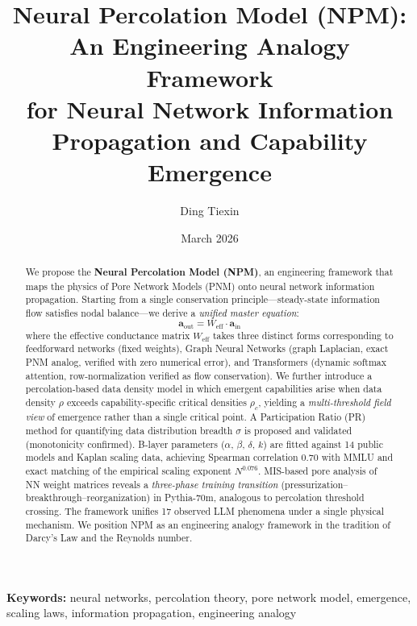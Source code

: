 \documentclass[11pt,a4paper]{article}
\newcommand{\Weff}{W_{\text{eff}}}
\begin{document}
\title{\textbf{Neural Percolation Model (NPM): An Engineering Analogy Framework\\
for Neural Network Information Propagation and Capability Emergence}}

\author[1]{Ding Tiexin}
\date{March 2026}

\maketitle

\begin{abstract}
We propose the \textbf{Neural Percolation Model (NPM)}, an engineering framework
that maps the physics of Pore Network Models (PNM) onto neural network information
propagation. Starting from a single conservation principle---steady-state information
flow satisfies nodal balance---we derive a \emph{unified master equation}:
\[
  \mathbf{a}_{\text{out}} = \Weff \cdot \mathbf{a}_{\text{in}}
\]
where the effective conductance matrix $\Weff$ takes three distinct forms
corresponding to feedforward networks (fixed weights), Graph Neural Networks
(graph Laplacian, exact PNM analog, verified with zero numerical error), and
Transformers (dynamic softmax attention, row-normalization verified as flow
conservation). We further introduce a percolation-based data density model in
which emergent capabilities arise when data density $\rho$ exceeds
capability-specific critical densities $\rho_c$, yielding a \emph{multi-threshold
field view} of emergence rather than a single critical point. A Participation
Ratio (PR) method for quantifying data distribution breadth $\sigma$ is proposed
and validated (monotonicity confirmed). B-layer parameters
($\alpha$, $\beta$, $\delta$, $k$) are fitted against 14 public models and
Kaplan scaling data, achieving Spearman correlation 0.70 with MMLU and exact
matching of the empirical scaling exponent $N^{0.076}$.
MIS-based pore analysis of NN weight matrices reveals a \emph{three-phase
training transition} (pressurization--breakthrough--reorganization) in
Pythia-70m, analogous to percolation threshold crossing. The framework
unifies 17 observed LLM phenomena under a single physical mechanism.
We position NPM as an engineering analogy framework in the tradition of Darcy's
Law and the Reynolds number.
\end{abstract}

\textbf{Keywords:} neural networks, percolation theory, pore network model,
emergence, scaling laws, information propagation, engineering analogy
\end{document}
